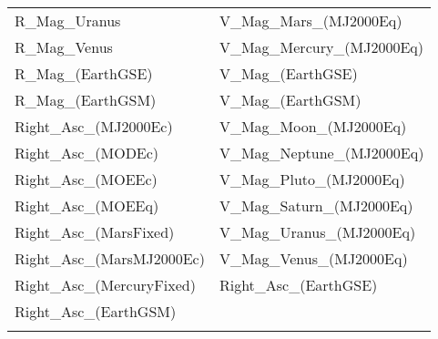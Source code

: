 \begin{table}[htbp!]
\begin{tabular}{ll}
    R\_Mag\_Uranus & V\_Mag\_Mars\_(MJ2000Eq)\\
    R\_Mag\_Venus & V\_Mag\_Mercury\_(MJ2000Eq)\\
    R\_Mag\_(EarthGSE) & V\_Mag\_(EarthGSE)\\
    R\_Mag\_(EarthGSM) & V\_Mag\_(EarthGSM)\\
    Right\_Asc\_(MJ2000Ec) & V\_Mag\_Moon\_(MJ2000Eq)\\
    Right\_Asc\_(MODEc) & V\_Mag\_Neptune\_(MJ2000Eq)\\
    Right\_Asc\_(MOEEc) & V\_Mag\_Pluto\_(MJ2000Eq)\\
    Right\_Asc\_(MOEEq) & V\_Mag\_Saturn\_(MJ2000Eq)\\
    Right\_Asc\_(MarsFixed) & V\_Mag\_Uranus\_(MJ2000Eq)\\
    Right\_Asc\_(MarsMJ2000Ec) & V\_Mag\_Venus\_(MJ2000Eq)\\
    Right\_Asc\_(MercuryFixed) & Right\_Asc\_(EarthGSE)\\
    Right\_Asc\_(EarthGSM) & \\
\label{Table: AstroSpherElems2}
\end{tabular}
\end{table}

\clearpage
